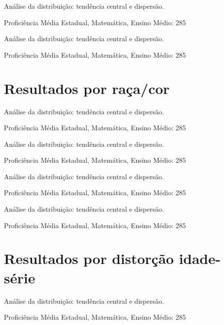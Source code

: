 \documentclass[
  ignorenonframetext,
]{beamer}
\begin{document}
\begin{frame}
Análise da distribuição: tendência central e dispersão.

Proficiência Média Estadual, Matemática, Ensino Médio: 285
\end{frame}

\begin{frame}
Análise da distribuição: tendência central e dispersão.

Proficiência Média Estadual, Matemática, Ensino Médio: 285
\end{frame}

\hypertarget{resultados-por-rauxe7acor-1}{%
\section{Resultados por raça/cor}\label{resultados-por-rauxe7acor-1}}

\begin{frame}
Análise da distribuição: tendência central e dispersão.

Proficiência Média Estadual, Matemática, Ensino Médio: 285
\end{frame}

\begin{frame}
Análise da distribuição: tendência central e dispersão.

Proficiência Média Estadual, Matemática, Ensino Médio: 285
\end{frame}

\begin{frame}
Análise da distribuição: tendência central e dispersão.

Proficiência Média Estadual, Matemática, Ensino Médio: 285
\end{frame}

\begin{frame}
Análise da distribuição: tendência central e dispersão.

Proficiência Média Estadual, Matemática, Ensino Médio: 285
\end{frame}

\hypertarget{resultados-por-distoruxe7uxe3o-idade-suxe9rie-1}{%
\section{Resultados por distorção
idade-série}\label{resultados-por-distoruxe7uxe3o-idade-suxe9rie-1}}

\begin{frame}
Análise da distribuição: tendência central e dispersão.

Proficiência Média Estadual, Matemática, Ensino Médio: 285
\end{frame}
\end{document}
